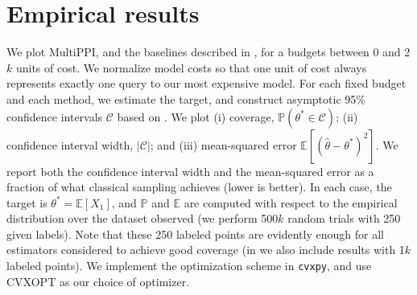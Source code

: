 \documentclass{article} %
\begin{document}


\section{Empirical results}\label{sec:results}
We plot MultiPPI, and the baselines described in , for a budgets between 0 and 2$k$ units of cost. We normalize model costs so that one unit of cost always represents exactly one query to our most expensive model. 
For each fixed budget and each method, we estimate the target, and construct asymptotic 95\% confidence intervals $\mathcal{C}$ based on . We plot (i) coverage, $\mathbb{P}(\theta^*\in\mathcal{C})$; (ii) confidence interval width, $|\mathcal{C}|$; and (iii) mean-squared error $\mathbb{E}[(\hat{\theta}-\theta^*)^2]$. We report both the confidence interval width and the mean-squared error as a fraction of what classical sampling achieves (lower is better). In each case, the target is $\theta^*=\mathbb{E}[X_1]$, and $\mathbb{P}$ and $\mathbb{E}$ are computed with respect to the empirical distribution over the dataset observed (we perform 500$k$ random trials with 250 given labels). Note that these 250 labeled points are evidently enough for all estimators considered to achieve good coverage (in  we also include results with 1$k$ labeled points). We implement the optimization scheme in \texttt{cvxpy}, and use CVXOPT as our choice of optimizer.
\end{document}
